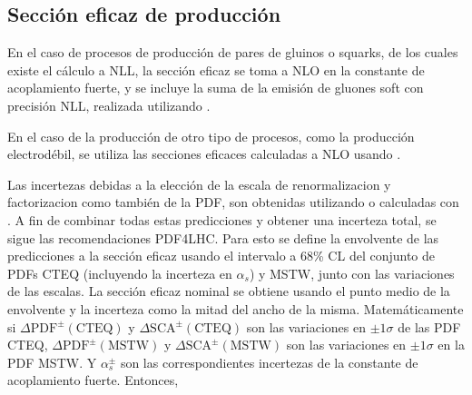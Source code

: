 \subsection{Sección eficaz de producción}
\label{sec:xs_calc}

En el caso de procesos de producción de pares de gluinos o squarks, de los cuales
existe el cálculo a NLL, la sección eficaz se toma a NLO en la constante de acoplamiento
fuerte, y se incluye la suma de la emisión de gluones soft con precisión NLL,
realizada utilizando {\nllfast}\cite{Kramer:2012bx,Beenakker:1996ch,Kulesza:2008jb,Kulesza:2009kq,Beenakker:2009ha,Beenakker:2011fu}
.

En el caso de la producción de otro tipo de procesos, como la producción electrodébil, se utiliza
las secciones eficaces calculadas a NLO usando {\prospino}.


\newcommand{\pdfcteqpm}{\ensuremath{\Delta\mathrm{PDF}^{\pm}(\mathrm{CTEQ})}}
\newcommand{\scacteqpm}{\ensuremath{\Delta\mathrm{SCA}^{\pm}(\mathrm{CTEQ})}}

\newcommand{\pdfmstwpm}{\ensuremath{\Delta\mathrm{PDF}^{\pm}(\mathrm{MSTW})}}
\newcommand{\scamstwpm}{\ensuremath{\Delta\mathrm{SCA}^{\pm}(\mathrm{MSTW})}}

\newcommand{\alphap}{\ensuremath{\alpha_s_+}}
\newcommand{\alpham}{\ensuremath{\alpha_s^-}}
\newcommand{\alphapm}{\ensuremath{\alpha_s^{\pm}}}

Las incertezas debidas a la elección de la escala de renormalizacion y
factorizacion como también de la PDF, son obtenidas utilizando {\nllfast} o
calculadas con {\prospino}. A fin de combinar todas estas predicciones y obtener
una incerteza total, se sigue las recomendaciones PDF4LHC\cite{Botje:2011sn}.
Para esto se define la envolvente de las predicciones a la sección eficaz usando
el intervalo a 68\% CL del conjunto de PDFs CTEQ (incluyendo la incerteza en
$\alpha_s$) y MSTW, junto con las variaciones de las escalas. La sección eficaz
nominal se obtiene usando el punto medio de la envolvente y la incerteza como la
mitad del ancho de la misma. Matemáticamente si {\pdfcteqpm} y {\scacteqpm} son
las variaciones en $\pm 1\sigma$ de las PDF CTEQ,  {\pdfmstwpm} y {\scamstwpm}
son las variaciones en $\pm 1\sigma$ en la PDF MSTW. Y {\alphapm} son las
correspondientes incertezas de la constante de acoplamiento fuerte. Entonces,

